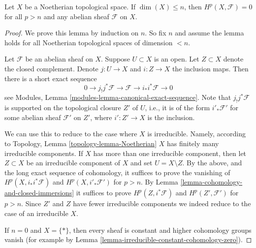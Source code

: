 \begin{lemma}
\label{lemma-vanishing-Noetherian}
Let $X$ be a Noetherian topological space.
If $\dim(X) \leq n$, then $H^p(X, \mathcal{F}) = 0$
for all $p > n$ and any abelian sheaf $\mathcal{F}$
on $X$.
\end{lemma}

\begin{proof}
We prove this lemma by induction on $n$.
So fix $n$ and assume the lemma holds for all
Noetherian topological spaces of dimension $< n$.

\medskip\noindent
Let $\mathcal{F}$ be an abelian sheaf on $X$.
Suppose $U \subset X$ is an open. Let $Z \subset X$
denote the closed complement.
Denote $j : U \to X$ and $i : Z \to X$ the inclusion maps.
Then there is a short exact sequence
$$
0 \to j_{!}j^*\mathcal{F} \to \mathcal{F} \to i_*i^*\mathcal{F} \to 0
$$
see Modules, Lemma \ref{modules-lemma-canonical-exact-sequence}.
Note that $j_!j^*\mathcal{F}$ is supported on
the topological closure $Z'$ of $U$, i.e., it is of
the form $i'_*\mathcal{F}'$ for some abelian sheaf $\mathcal{F}'$
on $Z'$, where $i' : Z' \to X$ is the inclusion.

\medskip\noindent
We can use this to reduce to the case where $X$ is irreducible.
Namely, according to
Topology, Lemma \ref{topology-lemma-Noetherian}
$X$ has finitely
many irreducible components. If $X$ has more than one irreducible
component, then let $Z \subset X$ be an irreducible component of $X$
and set $U = X \setminus Z$. By the above, and the long exact sequence
of cohomology, it suffices to prove the vanishing of
$H^p(X, i_*i^*\mathcal{F})$ and $H^p(X, i'_*\mathcal{F}')$ for $p > n$.
By Lemma \ref{lemma-cohomology-and-closed-immersions} it suffices to prove
$H^p(Z, i^*\mathcal{F})$ and $H^p(Z', \mathcal{F}')$ for $p > n$.
Since $Z'$ and $Z$ have fewer irreducible components we indeed
reduce to the case of an irreducible $X$.

\medskip\noindent
If $n = 0$ and $X = \{*\}$, then every sheaf is constant and
higher cohomology
groups vanish (for example by
Lemma \ref{lemma-irreducible-constant-cohomology-zero}).


\end{proof}
